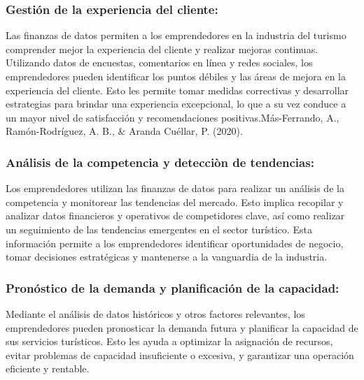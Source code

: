 \documentclass[
  letterpaper,
  DIV=11,
  numbers=noendperiod]{scrreprt}
\begin{document}
\hypertarget{gestiuxf3n-de-la-experiencia-del-cliente}{%
\subsubsection{Gestión de la experiencia del
cliente:}\label{gestiuxf3n-de-la-experiencia-del-cliente}}

Las finanzas de datos permiten a los emprendedores en la industria del
turismo comprender mejor la experiencia del cliente y realizar mejoras
continuas. Utilizando datos de encuestas, comentarios en línea y redes
sociales, los emprendedores pueden identificar los puntos débiles y las
áreas de mejora en la experiencia del cliente. Esto les permite tomar
medidas correctivas y desarrollar estrategias para brindar una
experiencia excepcional, lo que a su vez conduce a un mayor nivel de
satisfacción y recomendaciones positivas.Más-Ferrando, A.,
Ramón-Rodríguez, A. B., \& Aranda Cuéllar, P. (2020).

\hypertarget{anuxe1lisis-de-la-competencia-y-detecciuxf2n-de-tendencias}{%
\subsubsection{Análisis de la competencia y detecciòn de
tendencias:}\label{anuxe1lisis-de-la-competencia-y-detecciuxf2n-de-tendencias}}

Los emprendedores utilizan las finanzas de datos para realizar un
análisis de la competencia y monitorear las tendencias del mercado. Esto
implica recopilar y analizar datos financieros y operativos de
competidores clave, así como realizar un seguimiento de las tendencias
emergentes en el sector turístico. Esta información permite a los
emprendedores identificar oportunidades de negocio, tomar decisiones
estratégicas y mantenerse a la vanguardia de la industria.

\hypertarget{pronuxf3stico-de-la-demanda-y-planificaciuxf3n-de-la-capacidad}{%
\subsubsection{Pronóstico de la demanda y planificación de la
capacidad:}\label{pronuxf3stico-de-la-demanda-y-planificaciuxf3n-de-la-capacidad}}

Mediante el análisis de datos históricos y otros factores relevantes,
los emprendedores pueden pronosticar la demanda futura y planificar la
capacidad de sus servicios turísticos. Esto les ayuda a optimizar la
asignación de recursos, evitar problemas de capacidad insuficiente o
excesiva, y garantizar una operación eficiente y rentable.
\end{document}

